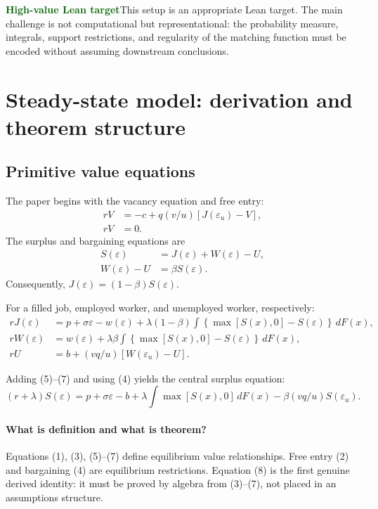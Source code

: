 \documentclass[11pt]{article}
\newcommand{\leanhigh}{\textcolor{darkgreen}{\textbf{High-value Lean target}}}
\newcommand{\statusbox}[2]{\colorbox{#1}{\parbox{0.94\linewidth}{#2}}}
\newcommand{\epsu}{\varepsilon_u}
\begin{document}
\statusbox{softgreen}{\leanhigh\quad This setup is an appropriate Lean target. The main challenge is not computational but representational: the probability measure, integrals, support restrictions, and regularity of the matching function must be encoded without assuming downstream conclusions.}

\section{Steady-state model: derivation and theorem structure}

\subsection{Primitive value equations}
The paper begins with the vacancy equation and free entry:
\begin{align}
rV &= -c+q(v/u)[J(\epsu)-V], \tag{1}\\
rV &=0. \tag{2}
\end{align}
The surplus and bargaining equations are
\begin{align}
S(\varepsilon)&=J(\varepsilon)+W(\varepsilon)-U, \tag{3}\\
W(\varepsilon)-U&=\beta S(\varepsilon). \tag{4}
\end{align}
Consequently, $J(\varepsilon)=(1-\beta)S(\varepsilon)$.

For a filled job, employed worker, and unemployed worker, respectively:
\begin{align}
rJ(\varepsilon)
&=p+\sigma\varepsilon-w(\varepsilon)
+\lambda(1-\beta)\int\left\{\max[S(x),0]-S(\varepsilon)\right\}\,dF(x), \tag{5}\\
rW(\varepsilon)
&=w(\varepsilon)
+\lambda\beta\int\left\{\max[S(x),0]-S(\varepsilon)\right\}\,dF(x), \tag{6}\\
rU&=b+(vq/u)[W(\epsu)-U]. \tag{7}
\end{align}

Adding (5)--(7) and using (4) yields the central surplus equation:
\begin{equation}
(r+\lambda)S(\varepsilon)
=p+\sigma\varepsilon-b
+\lambda\int\max[S(x),0] \,dF(x)
-\beta(vq/u)S(\epsu). \tag{8}
\end{equation}

\paragraph{What is definition and what is theorem?}
Equations (1), (3), (5)--(7) define equilibrium value relationships. Free entry (2) and bargaining (4) are equilibrium restrictions. Equation (8) is the first genuine derived identity: it must be proved by algebra from (3)--(7), not placed in an assumptions structure.
\end{document}
